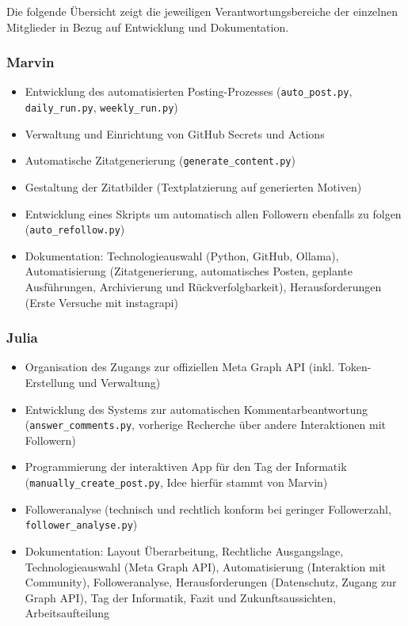 \documentclass[a4paper,12pt]{article}
\begin{document}
Die folgende Übersicht zeigt die jeweiligen Verantwortungsbereiche der einzelnen Mitglieder in Bezug auf Entwicklung und Dokumentation.

\subsubsection*{Marvin}

\begin{itemize}
    \item Entwicklung des automatisierten Posting-Prozesses (\texttt{auto\_post.py}, \texttt{daily\_run.py}, \texttt{weekly\_run.py})
    \item Verwaltung und Einrichtung von GitHub Secrets und Actions
    \item Automatische Zitatgenerierung (\texttt{generate\_content.py})
    \item Gestaltung der Zitatbilder (Textplatzierung auf generierten Motiven)
    \item Entwicklung eines Skripts um automatisch allen Followern ebenfalls zu folgen (\texttt{auto\_refollow.py})
    \item Dokumentation: Technologieauswahl (Python, GitHub, Ollama), Automatisierung (Zitatgenerierung, automatisches Posten, geplante Ausführungen, Archivierung und Rückverfolgbarkeit), Herausforderungen (Erste Versuche mit instagrapi)
\end{itemize}

\subsubsection*{Julia}

\begin{itemize}
    \item Organisation des Zugangs zur offiziellen Meta Graph API (inkl. Token-Erstellung und Verwaltung)
    \item Entwicklung des Systems zur automatischen Kommentarbeantwortung (\texttt{answer\_comments.py}, vorherige Recherche über andere Interaktionen mit Followern)
    \item Programmierung der interaktiven App für den Tag der Informatik (\texttt{manually\_create\_post.py}, Idee hierfür stammt von Marvin)
    \item Followeranalyse (technisch und rechtlich konform bei geringer Followerzahl, \texttt{follower\_analyse.py})
    \item Dokumentation: Layout Überarbeitung, Rechtliche Ausgangslage, Technologieauswahl (Meta Graph API), Automatisierung (Interaktion mit Community), Followeranalyse, Herausforderungen (Datenschutz, Zugang zur Graph API), Tag der Informatik, Fazit und Zukunftsaussichten, Arbeitsaufteilung
\end{itemize}
\end{document}
